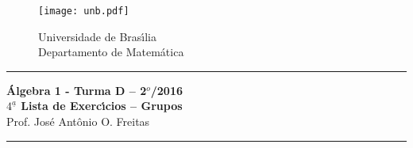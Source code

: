 \documentclass[12pt]{article}
\newcounter{exercicios}
\newcommand{\questao}{2
\addtocounter{exercicios}{1}
\noindent{\bf Exerc{\'\i}cio \arabic{exercicios}: }}
\begin{document}
\pagestyle{empty}

\begin{figure}[h]
        \begin{minipage}[c]{1.7cm}
        \texttt{[image: unb.pdf]}
        \end{minipage}%
        \hspace{0pt}
        \begin{minipage}[c]{4in}
          {Universidade de Bras{\'\i}lia} \\
          {Departamento de Matem{\'a}tica}
\end{minipage}
\end{figure}
\vspace{-1cm}\hrule

\begin{center}
 {\Large\bf {\'A}lgebra 1 - Turma D -- 2$^{o}$/2016} \\
 \vspace{9pt} {\large\bf $4^{\underline{a}}$ Lista de Exerc{\'\i}cios -- Grupos}\\
 \vspace{9pt} Prof. Jos{\'e} Ant{\^o}nio O. Freitas
\end{center}
\hrule

\vspace{0.6cm}

\end{document}
